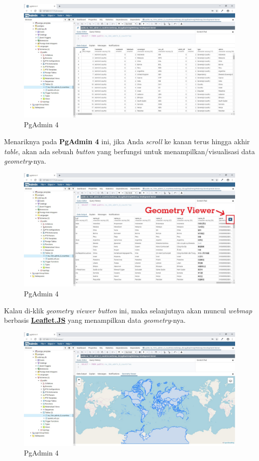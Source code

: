 \documentclass[]{book}
\begin{document}
\begin{figure}
\centering
\includegraphics{./img/pgadmin4-show-all-entries.jpg}
\caption{PgAdmin 4}
\end{figure}

Menariknya pada \textbf{PgAdmin 4} ini, jika Anda \emph{scroll} ke kanan terus hingga akhir \emph{table}, akan ada sebuah \emph{button} yang berfungsi untuk menampilkan/visualisasi data \emph{geometry}-nya.

\begin{figure}
\centering
\includegraphics{./img/pgadmin4-geometry-viewer-button.jpg}
\caption{PgAdmin 4}
\end{figure}

Kalau di-klik \emph{geometry viewer button} ini, maka selanjutnya akan muncul \emph{webmap} berbasis \href{https://leafletjs.com/}{\textbf{Leaflet.JS}} yang menampilkan data \emph{geometry}-nya.

\begin{figure}
\centering
\includegraphics{./img/pgadmin4-geometry-viewer-map.jpg}
\caption{PgAdmin 4}
\end{figure}
\end{document}
